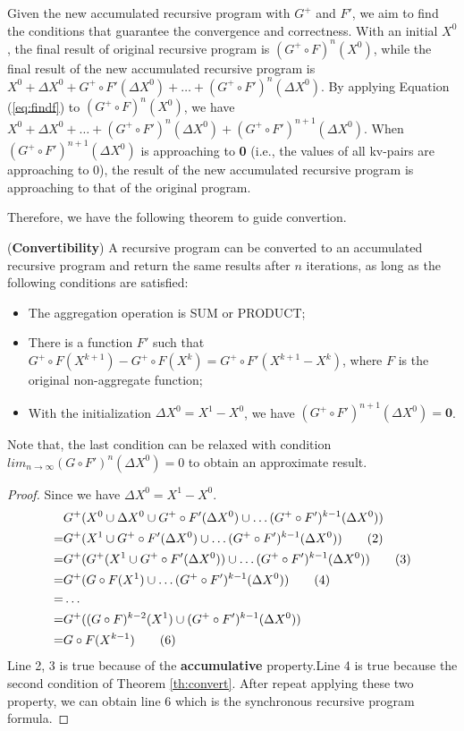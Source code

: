 Given the new accumulated recursive program with $G^+$ and $F'$, we aim to find the conditions that guarantee the convergence and correctness. With an initial $X^0$, the final result of original recursive program is $(G^{+}\circ F)^n(X^0)$, while the final result of the new accumulated recursive program is $X^0+\Delta X^0+G^+\circ F'(\Delta X^0)+\ldots+(G^+\circ F')^n(\Delta X^0)$. By applying Equation (\ref{eq:findf}) to $(G^{+}\circ F)^n(X^0)$, we have $X^0+\Delta X^0+\ldots+(G^+\circ F')^n(\Delta X^0)+(G^+\circ F')^{n+1}(\Delta X^0)$. When $(G^+\circ F')^{n+1}(\Delta X^0)$ is approaching to \textbf{0} (i.e., the values of all kv-pairs are approaching to 0), the result of the new accumulated recursive program is approaching to that of the original program.

Therefore, we have the following theorem to guide convertion.
\begin{theorem}
	\label{th:convert}
	(\textbf{Convertibility}) A recursive program can be converted to an accumulated recursive program and return the same results after $n$ iterations, as long as the following conditions are satisfied:\\
	\begin{itemize}
		\item The aggregation operation is SUM or {\color{red}PRODUCT};
		\item There is a function $F'$ such that $G^{+}\circ F(X^{k+1})-G^{+}\circ F(X^{k})=G^{+}\circ F'(X^{k+1}-X^k)$, where $F$ is the original non-aggregate function;
		\item With the initialization $\Delta X^0=X^1-X^0$, we have $(G^+\circ F')^{n+1}(\Delta X^0)=\textbf{0}$.
	\end{itemize}
\end{theorem}

Note that, the last condition can be relaxed with condition $lim_{n\rightarrow\infty}(G\circ F')^n(\Delta X^0)=0$ to obtain an approximate result.

 \begin{proof}
 	Since we have $\Delta X^0=X^1-X^0$.
 	\begin{align}
 	&G^+(X^0\cup \Delta X^0 \cup G^+\circ F'(\Delta X^0)\cup \ldots (G^+ \circ F')^{k-1}(\Delta X^0 )) \notag\\
 	=&G^+(X^1 \cup G^+\circ F'(\Delta X^0  )\cup \ldots (G^+ \circ F')^{k-1}(\Delta X^0  )) \tag{2}\\
 	=&G^+(G^+(X^1\cup G^+\circ F'(\Delta X^0  ))\cup \ldots (G^+ \circ F')^{k-1}(\Delta X^0 )) \tag{3}\\
 	=&G^+(G\circ F(X^1)\cup \ldots (G^+ \circ F')^{k-1}(\Delta X^0 )) \tag{4}\\
 	=&\ldots \notag\\
 	=&G^+((G\circ F)^{k-2}(X^1)\cup(G^+ \circ F')^{k-1}(\Delta X^0 )) \notag\\
 	=&G\circ F(X^{k-1})\tag{6}
 	\end{align}
 	Line 2, 3 is true because of the \textbf{accumulative} property.Line 4 is true because the second condition of Theorem \ref{th:convert}. After repeat applying these two property, we can obtain line 6 which is the synchronous recursive program formula. 
 \end{proof}
 
